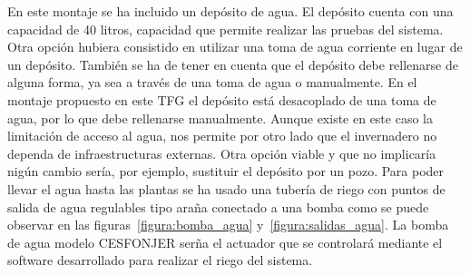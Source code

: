 \documentclass[a4paper, 12pt, oneside]{book}
\begin{document}
En este montaje se ha incluido un depósito de agua. El depósito cuenta con una capacidad de 40 litros, capacidad que permite realizar las pruebas del sistema.  
Otra opción hubiera consistido en utilizar una toma de agua corriente en lugar de un depósito. También se ha de tener en cuenta que el depósito debe rellenarse de alguna forma, ya sea a través de una toma de agua o manualmente. En el montaje propuesto en este TFG el depósito está desacoplado de una toma de agua, por lo que debe rellenarse manualmente.  Aunque existe en este caso la limitación de acceso al agua, nos permite por otro lado que el invernadero no dependa de infraestructuras externas. Otra opción viable y que no implicaría nigún cambio sería, por ejemplo, sustituir el depósito por un pozo. Para poder llevar el agua hasta las plantas se ha usado una tubería de riego con puntos de salida de agua regulables tipo araña conectado a una bomba como se puede observar en las figuras~\ref{figura:bomba_agua} y~\ref{figura:salidas_agua}. La bomba de agua modelo CESFONJER serña el actuador que se controlará mediante el software desarrollado para realizar el riego del sistema.
\end{document}
